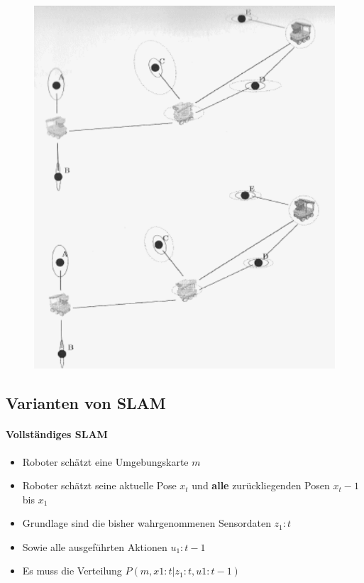\begin{minipage}[]{0.5\textwidth}
\begin{figure}[H]
	\begin{center}
		\includegraphics[scale=0.5]{Resources/PNG/LandmarkenBeispiel2.PNG}
		\caption{}
		\label{fig:PNG/LandmarkenBeispie2l.PNG}
	\end{center}
\end{figure}
\end{minipage}
\subsection{Varianten von SLAM}
\paragraph{Vollständiges SLAM}
\begin{itemize}
	\item Roboter schätzt eine Umgebungskarte $m$
	\item Roboter schätzt seine aktuelle Pose $x_t$ und \textbf{alle} zurückliegenden Posen $x_t-1$ bis $x_1$
	\item Grundlage sind die bisher wahrgenommenen Sensordaten $z_1:t$
	\item Sowie alle ausgeführten Aktionen $u_1:t-1$
	\item Es muss die Verteilung $P(m, x1:t | z_1:t, u1:t-1)$
\end{itemize}
